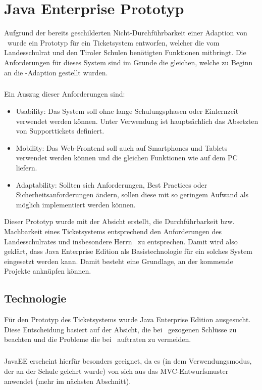 \chapter{Java Enterprise Prototyp}
\label{jee_proto}
\def \currentAuthor{Jakob Tomasi}
Aufgrund der bereits geschilderten Nicht-Durchführbarkeit einer Adaption von \getOst\ wurde ein Prototyp für ein Ticketsystem entworfen, welcher die vom Landesschulrat und den Tiroler Schulen benötigten Funktionen mitbringt. Die Anforderungen für dieses System sind im Grunde die gleichen, welche zu Beginn an die \getOst-Adaption gestellt wurden.
\paragraph{}
Ein Auszug dieser Anforderungen sind:

\begin{itemize}
	\item Usability: Das System soll ohne lange Schulungsphasen oder Einlernzeit verwendet werden können. Unter Verwendung ist hauptsächlich das Absetzten von Supporttickets definiert.
	\item Mobility: Das Web-Frontend soll auch auf Smartphones und Tablets verwendet werden können und die gleichen Funktionen wie auf dem PC liefern.
	\item Adaptability: Sollten sich Anforderungen, Best Practices oder Sicherheitsanforderungen ändern, sollen diese mit so geringem Aufwand als möglich implementiert werden können.
\end{itemize}

Dieser Prototyp wurde mit der Absicht erstellt, die Durchführbarkeit bzw. Machbarkeit eines Ticketsystems entsprechend den Anforderungen des Landesschulrates und insbesondere Herrn \getHammerl\ zu entsprechen. Damit wird also geklärt, dass Java Enterprise Edition als Basistechnologie für ein solches System eingesetzt werden kann. Damit besteht eine Grundlage, an der kommende Projekte anknüpfen können.

\section{Technologie}
Für den Prototyp des Ticketsystems wurde Java Enterprise Edition ausgesucht. Diese Entscheidung basiert auf der Absicht, die bei \getOst\ gezogenen Schlüsse zu beachten und die Probleme die bei \getOst\ auftraten zu vermeiden.
\paragraph{}
JavaEE erscheint hierfür besonders geeignet, da es (in dem Verwendungsmodus, der an der Schule gelehrt wurde) von sich aus das MVC-Entwurfsmuster anwendet (mehr im nächsten Abschnitt).
